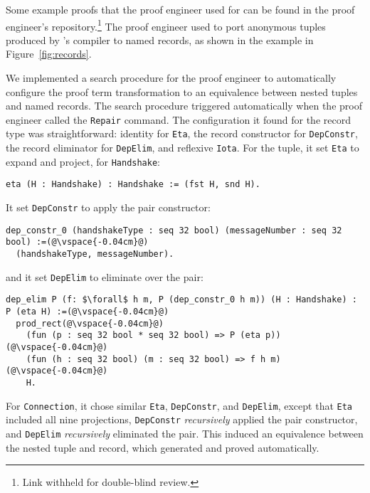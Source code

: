Some example proofs that the proof engineer used \toolname for
can be found in the proof engineer's repository.\footnote{Link withheld for double-blind review.}
The proof engineer used \toolname to port anonymous tuples produced by \company's compiler
to named records, as shown in the example in Figure~\ref{fig:records}.

We implemented a search procedure for the proof engineer to automatically configure the proof term transformation to an equivalence
between nested tuples and named records.
The search procedure triggered automatically when the proof engineer called the \lstinline{Repair} command.
The configuration it found for the record type was straightforward: identity for \lstinline{Eta},
the record constructor for \lstinline{DepConstr}, the record eliminator for \lstinline{DepElim}, and reflexive \lstinline{Iota}.
For the tuple, it set \lstinline{Eta} to expand and project, for \lstinline{Handshake}:
\begin{lstlisting}[backgroundcolor=\color{cyan!30}]
eta (H : Handshake) : Handshake := (fst H, snd H).
\end{lstlisting}
It set \lstinline{DepConstr} to apply the pair constructor:

\begin{lstlisting}[backgroundcolor=\color{cyan!30}]
dep_constr_0 (handshakeType : seq 32 bool) (messageNumber : seq 32 bool) :=(@\vspace{-0.04cm}@)
  (handshakeType, messageNumber).
\end{lstlisting}
and it set \lstinline{DepElim} to eliminate over the pair:

\begin{lstlisting}[backgroundcolor=\color{cyan!30}]
dep_elim P (f: $\forall$ h m, P (dep_constr_0 h m)) (H : Handshake) : P (eta H) :=(@\vspace{-0.04cm}@)
  prod_rect(@\vspace{-0.04cm}@)
    (fun (p : seq 32 bool * seq 32 bool) => P (eta p))(@\vspace{-0.04cm}@)
    (fun (h : seq 32 bool) (m : seq 32 bool) => f h m)(@\vspace{-0.04cm}@)
    H.
\end{lstlisting}
For \lstinline{Connection}, it chose similar \lstinline{Eta}, \lstinline{DepConstr}, and \lstinline{DepElim},
except that \lstinline{Eta} included all nine projections, \lstinline{DepConstr} \textit{recursively} applied the
pair constructor, and \lstinline{DepElim} \textit{recursively} eliminated the pair.
This induced an equivalence between the nested tuple and record,
which \toolname generated and proved automatically.

